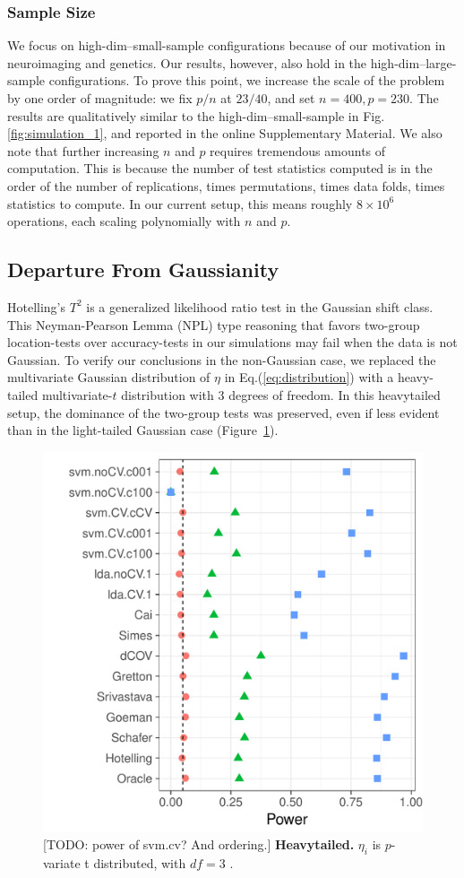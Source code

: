 \documentclass[]{bio}
\begin{document}
\subsubsection{Sample Size}
We focus on high-dim--small-sample configurations because of our motivation in neuroimaging and genetics. 
Our results, however, also  hold in the high-dim--large-sample configurations.
To prove this point, we increase the scale of the problem by one order of magnitude: we fix $p/n$ at $23/40$, and set $n=400, p=230$. 
The results are qualitatively similar to the high-dim--small-sample in Fig.\ref{fig:simulation_1}, and reported in the online Supplementary Material.
We also note that further increasing $n$ and $p$ requires tremendous amounts of computation. 
This is because the number of test statistics computed is in the order of the number of replications, times permutations, times data folds, times statistics to compute. 
In our current setup, this means roughly $8 \times 10^6$ operations, each scaling polynomially with $n$ and $p$. 


\subsection{Departure From Gaussianity}
\label{sec:heavytailed}
Hotelling's $T^2$ is a generalized likelihood ratio test in the Gaussian shift class. 
This Neyman-Pearson Lemma (NPL) type reasoning that favors two-group location-tests over accuracy-tests in our simulations may fail when the data is not Gaussian.
To verify our conclusions in the non-Gaussian case, we replaced the multivariate Gaussian distribution of $\eta$ in Eq.(\ref{eq:distribution}) with a heavy-tailed multivariate-$t$ distribution with $3$ degrees of freedom.
In this heavytailed setup, the dominance of the two-group tests was preserved, even if less evident than in the light-tailed Gaussian case (Figure~\ref{fig:t_null}).

\begin{figure}[th]
	\centering
	\includegraphics[width=0.5\columnwidth]{"art/file9"}
	\caption{[TODO: power of svm.cv? And ordering.]
		\textbf{Heavytailed.} $\eta_i$ is $p$-variate t distributed, with $df=3$ .  } 
	\label{fig:t_null}
\end{figure}
\end{document}

